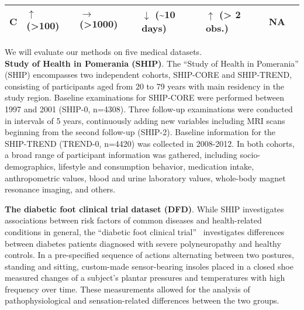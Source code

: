 \documentclass[
]{book}
\begin{document}
\begin{longtable}[]{@{}lllllll@{}}
\begin{minipage}[t]{0.05\columnwidth}
C\strut
\end{minipage} & \begin{minipage}[t]{0.13\columnwidth}\raggedright
\(\uparrow\) (\textgreater100)\strut
\end{minipage} & \begin{minipage}[t]{0.13\columnwidth}\raggedright
\(\rightarrow\) (\textgreater1000)\strut
\end{minipage} & \begin{minipage}[t]{0.13\columnwidth}\raggedright
\(\downarrow\) (\textasciitilde10 days)\strut
\end{minipage} & \begin{minipage}[t]{0.13\columnwidth}\raggedright
\(\uparrow\) (\textgreater{} 2 obs.)\strut
\end{minipage} & \begin{minipage}[t]{0.13\columnwidth}\raggedright
NA\strut
\end{minipage}\tabularnewline
\bottomrule
\end{longtable}

We will evaluate our methods on five medical datasets.\\
\textbf{Study of Health in Pomerania (SHIP)}. The ``Study of Health in Pomerania'' (SHIP) \autocite{Voelzke:SHIP11} encompasses two independent cohorts, SHIP-CORE and SHIP-TREND, consisting of participants aged from 20 to 79 years with main residency in the study region.
Baseline examinations for SHIP-CORE were performed between 1997 and 2001 (SHIP-0, n=4308). Three follow-up examinations were conducted in intervals of 5 years, continuously adding new variables including MRI scans beginning from the second follow-up (SHIP-2).
Baseline information for the SHIP-TREND (TREND-0, n=4420) was collected in 2008-2012.
In both cohorts, a broad range of participant information was gathered, including socio-demographics, lifestyle and consumption behavior, medication intake, anthropometric values, blood and urine laboratory values, whole-body magnet resonance imaging, and others.

\textbf{The diabetic foot clinical trial dataset (DFD)}. While SHIP investigates associations between risk factors of common diseases and health-related conditions in general, the ``diabetic foot clinical trial''~\autocite{Niemann:PONE2016,Niemann:EBioMedicine2020}
investigates differences between diabetes patients diagnosed with severe polyneuropathy and healthy controls.
In a pre-specified sequence of actions alternating between two postures, standing and sitting, custom-made sensor-bearing insoles placed in a closed shoe measured changes of a subject's plantar pressures and temperatures with high frequency over time.
These measurements allowed for the analysis of pathophysiological and sensation-related differences between the two groups.
\end{document}
